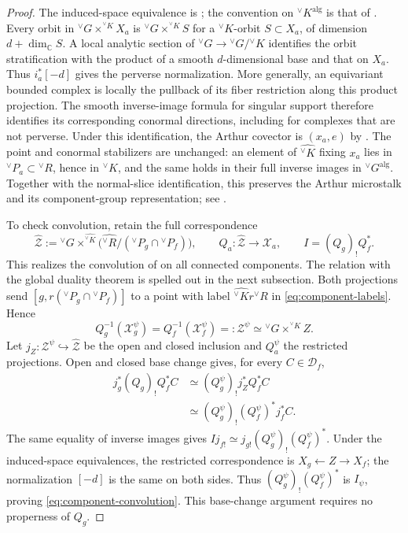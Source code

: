 \documentclass[10pt]{amsart}
\numberwithin{equation}{section}
\theoremstyle{plain}
\theoremstyle{definition}
\theoremstyle{remark}
\newcommand{\CC}{\mathbb C}
\newcommand{\vG}{{}^{\vee}G}
\newcommand{\vR}{{}^{\vee}R}
\newcommand{\vK}{{}^{\vee}K}
\newcommand{\vP}{{}^{\vee}P}
\newcommand{\alg}{\mathrm{alg}}
\begin{document}
\begin{proof}
The induced-space equivalence is
\cite[Proposition~7.14]{ABV92}; the convention on $\vK^{\alg}$ is that
of \cite[(5.10) and (8.4)]{ABV92}.
Every orbit in $\vG\times^{\vK}X_a$ is $\vG\times^{\vK}S$ for a
$\vK$-orbit $S\subset X_a$, of dimension $d+\dim_{\CC}S$.
A local analytic section of $\vG\to\vG/\vK$ identifies the orbit
stratification with the product of a smooth $d$-dimensional base and
that on $X_a$. Thus $i_a^*[-d]$ gives the perverse normalization.
More generally, an equivariant bounded complex is locally the pullback
of its fiber restriction along this product projection. The smooth
inverse-image formula for singular support therefore identifies its
corresponding conormal directions, including for complexes that are
not perverse.
Under this identification, the Arthur covector is $(x_a,e)$ by
\cite[Propositions~3.7.1 and~3.7.3]{AIMV26}.
The point and conormal stabilizers are unchanged: an element of
$\widehat{\vK}$ fixing $x_a$ lies in $\vP_a\subset\vR$, hence in
$\vK$, and the same holds in their full inverse images in
$\vG^{\alg}$. Together with the normal-slice identification, this
preserves the Arthur microstalk and its component-group representation;
see \cite[Propositions~7.14 and~21.3]{ABV92}.

To check convolution, retain the full correspondence
\begin{equation}\label{eq:full-incidence}
 \widehat{\mathcal Z}
 :=\vG\times^{\widehat{\vK}}
       \bigl(\widehat{\vR}/(\vP_g\cap\vP_f)\bigr),
 \qquad Q_a:\widehat{\mathcal Z}\longrightarrow\mathcal X_a,
 \qquad I=(Q_g)_!Q_f^*.
\end{equation}
This realizes the convolution of \cite[Section~3.5]{AIMV26} on all
connected components. The relation with the global duality theorem is
spelled out in the next subsection.
Both projections send $[g,r(\vP_g\cap\vP_f)]$ to a point with label
$\widehat{\vK}r\vR$ in \eqref{eq:component-labels}. Hence
\begin{equation}\label{eq:equal-component-preimages}
 Q_g^{-1}(\mathcal X_g^\psi)
 =Q_f^{-1}(\mathcal X_f^\psi)
 =:\mathcal Z^\psi
 \simeq\vG\times^{\vK}Z.
\end{equation}
Let $j_Z:\mathcal Z^\psi\hookrightarrow\widehat{\mathcal Z}$ be the
open and closed inclusion and $Q_a^\psi$ the restricted projections.
Open and closed base change gives, for every $C\in\mathcal D_f$,
\[
 \begin{aligned}
 j_g^*(Q_g)_!Q_f^*C
 &\simeq(Q_g^\psi)_!j_Z^*Q_f^*C\\
 &\simeq(Q_g^\psi)_!(Q_f^\psi)^*j_f^*C.
 \end{aligned}
\]
The same equality of inverse images gives
$I j_{f!}\simeq j_{g!}(Q_g^\psi)_!(Q_f^\psi)^*$.
Under the induced-space equivalences, the restricted correspondence is
$X_g\leftarrow Z\to X_f$; the normalization $[-d]$ is the same on both
sides. Thus $(Q_g^\psi)_!(Q_f^\psi)^*$ is $I_\psi$, proving
\eqref{eq:component-convolution}. This base-change argument requires
no properness of $Q_g$.
\end{proof}
\end{document}
